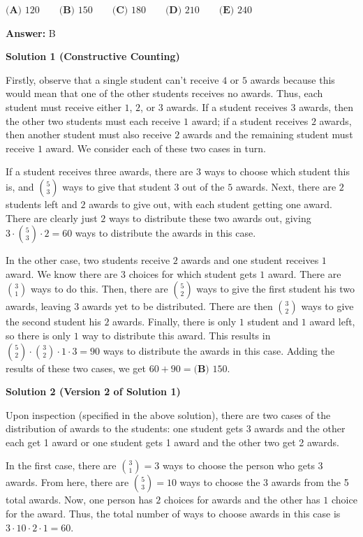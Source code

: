 \begin{enumerate}
 $\textbf{(A) }120 \qquad \textbf{(B) }150 \qquad \textbf{(C) }180 \qquad \textbf{(D) }210 \qquad \textbf{(E) }240$

 \textbf{Answer: }B



\textbf{Solution 1 (Constructive Counting)}

Firstly, observe that a single student can't receive $4$ or $5$ awards because this would mean that one of the other students receives no awards. Thus, each student must receive either $1$, $2$, or $3$ awards. If a student receives $3$ awards, then the other two students must each receive $1$ award; if a student receives $2$ awards, then another student must also receive $2$ awards and the remaining student must receive $1$ award. We consider each of these two cases in turn.

 If a student receives three awards, there are $3$ ways to choose which student this is, and $\binom{5}{3}$ ways to give that student $3$ out of the $5$ awards. Next, there are $2$ students left and $2$ awards to give out, with each student getting one award. There are clearly just $2$ ways to distribute these two awards out, giving $3\cdot\binom{5}{3}\cdot 2=60$ ways to distribute the awards in this case.

 In the other case, two students receive $2$ awards and one student receives $1$ award. We know there are $3$ choices for which student gets $1$ award. There are $\binom{3}{1}$ ways to do this. Then, there are $\binom{5}{2}$ ways to give the first student his two awards, leaving $3$ awards yet to be distributed. There are then $\binom{3}{2}$ ways to give the second student his $2$ awards. Finally, there is only $1$ student and $1$ award left, so there is only $1$ way to distribute this award. This results in $\binom{5}{2}\cdot\binom{3}{2}\cdot 1\cdot 3 =90$ ways to distribute the awards in this case. Adding the results of these two cases, we get $60+90=\boxed{\textbf{(B) }150}$.

 



\textbf{Solution 2 (Version 2 of Solution 1)}

Upon inspection (specified in the above solution), there are two cases of the distribution of awards to the students: one student gets 3 awards and the other each get 1 award or one student gets 1 award and the other two get 2 awards. 

 
In the first case, there are $\binom{3}{1} = 3$ ways to choose the person who gets 3 awards. From here, there are $\binom{5}{3} = 10$ ways to choose the 3 awards from the 5 total awards. Now, one person has $2$ choices for awards and the other has $1$ choice for the award. Thus, the total number of ways to choose awards in this case is $3 \cdot 10 \cdot 2 \cdot 1 = 60$.  


\end{enumerate}
